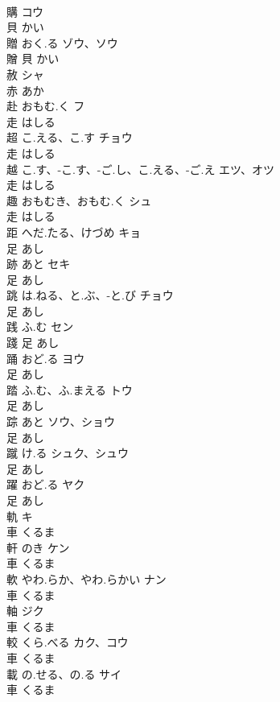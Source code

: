 \documentclass[8pt]{extreport}
\begin{document}
\begin{CJK}{UTF8}{min}
\\	購		コウ	
\\	貝		かい		
\\	贈	おく.る	ゾウ、ソウ	
\\	贈	貝		かい		
\\	赦		シャ	
\\	赤		あか		
\\	赴	おもむ.く	フ	
\\	走		はしる		
\\	超	こ.える、こ.す	チョウ	
\\	走		はしる		
\\	越	こ.す、-こ.す、-ご.し、こ.える、-ご.え	エツ、オツ	
\\	走		はしる		
\\	趣	おもむき、おもむ.く	シュ	
\\	走		はしる		
\\	距	へだ.たる、けづめ	キョ	
\\	足		あし		
\\	跡	あと	セキ	
\\	足		あし		
\\	跳	は.ねる、と.ぶ、-と.び	チョウ	
\\	足		あし		
\\	践	ふ.む	セン	
\\	踐	足		あし		
\\	踊	おど.る	ヨウ	
\\	足		あし		
\\	踏	ふ.む、ふ.まえる	トウ	
\\	足		あし		
\\	踪	あと	ソウ、ショウ	
\\	足		あし		
\\	蹴	け.る	シュク、シュウ	
\\	足		あし		
\\	躍	おど.る	ヤク	
\\	足		あし		
\\	軌		キ	
\\	車		くるま		
\\	軒	のき	ケン	
\\	車		くるま		
\\	軟	やわ.らか、やわ.らかい	ナン	
\\	車		くるま		
\\	軸		ジク	
\\	車		くるま		
\\	較	くら.べる	カク、コウ	
\\	車		くるま		
\\	載	の.せる、の.る	サイ	
\\	車		くるま		

\end{CJK}
\end{document}
